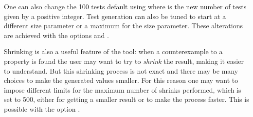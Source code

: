 
%
%
%


%
%
%


%
One can also change the 100 tests default  using  where
 is the new number of tests given by a positive integer.
%
%
Test generation can also be tuned to start at a different size parameter
or a maximum for the size parameter.
%
These alterations are achieved with the options
 and .


Shrinking is also a useful feature of the tool: when a counterexample to a property is found the user may want \plqc{}
to try to \emph{shrink} the result, making it easier to understand.
%
But this shrinking process is not exact and there may be many choices to
make the generated values smaller.
%
For this reason one may want to impose different limits for the maximum
number of shrinks performed, which is set to 500, either for getting 
a smaller result or to make the process faster.
%
This is possible with the option .
%

